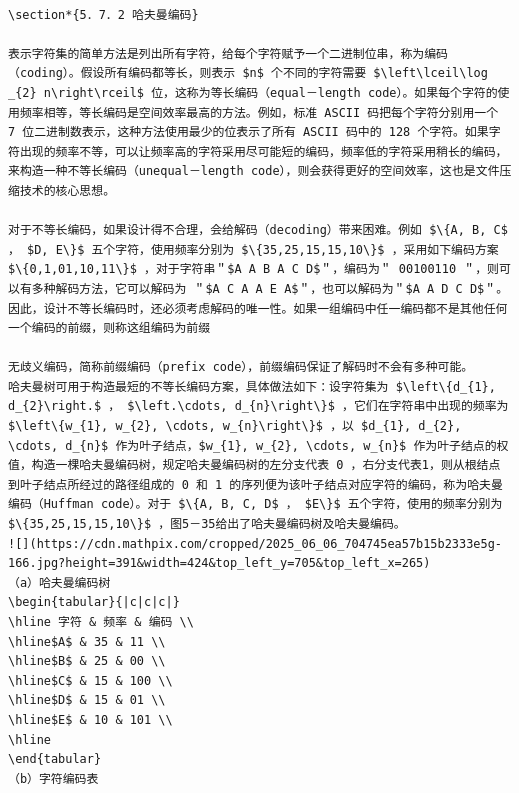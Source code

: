 \documentclass[10pt]{article}
\begin{document}
\begin{verbatim}

\section*{5．7．2 哈夫曼编码}

表示字符集的简单方法是列出所有字符，给每个字符赋予一个二进制位串，称为编码（coding）。假设所有编码都等长，则表示 $n$ 个不同的字符需要 $\left\lceil\log _{2} n\right\rceil$ 位，这称为等长编码（equal－length code）。如果每个字符的使用频率相等，等长编码是空间效率最高的方法。例如，标准 ASCII 码把每个字符分别用一个 7 位二进制数表示，这种方法使用最少的位表示了所有 ASCII 码中的 128 个字符。如果字符出现的频率不等，可以让频率高的字符采用尽可能短的编码，频率低的字符采用稍长的编码，来构造一种不等长编码（unequal－length code），则会获得更好的空间效率，这也是文件压缩技术的核心思想。

对于不等长编码，如果设计得不合理，会给解码（decoding）带来困难。例如 $\{A, B, C$ ， $D, E\}$ 五个字符，使用频率分别为 $\{35,25,15,15,10\}$ ，采用如下编码方案 $\{0,1,01,10,11\}$ ，对于字符串＂$A A B A C D$＂，编码为＂ 00100110 ＂，则可以有多种解码方法，它可以解码为 ＂$A C A A E A$＂，也可以解码为＂$A A D C D$＂。因此，设计不等长编码时，还必须考虑解码的唯一性。如果一组编码中任一编码都不是其他任何一个编码的前缀，则称这组编码为前缀

无歧义编码，简称前缀编码（prefix code），前缀编码保证了解码时不会有多种可能。
哈夫曼树可用于构造最短的不等长编码方案，具体做法如下：设字符集为 $\left\{d_{1}, d_{2}\right.$ ， $\left.\cdots, d_{n}\right\}$ ，它们在字符串中出现的频率为 $\left\{w_{1}, w_{2}, \cdots, w_{n}\right\}$ ，以 $d_{1}, d_{2}, \cdots, d_{n}$ 作为叶子结点，$w_{1}, w_{2}, \cdots, w_{n}$ 作为叶子结点的权值，构造一棵哈夫曼编码树，规定哈夫曼编码树的左分支代表 0 ，右分支代表1，则从根结点到叶子结点所经过的路径组成的 0 和 1 的序列便为该叶子结点对应字符的编码，称为哈夫曼编码（Huffman code）。对于 $\{A, B, C, D$ ， $E\}$ 五个字符，使用的频率分别为 $\{35,25,15,15,10\}$ ，图5－35给出了哈夫曼编码树及哈夫曼编码。
![](https://cdn.mathpix.com/cropped/2025_06_06_704745ea57b15b2333e5g-166.jpg?height=391&width=424&top_left_y=705&top_left_x=265)
（a）哈夫曼编码树
\begin{tabular}{|c|c|c|}
\hline 字符 & 频率 & 编码 \\
\hline$A$ & 35 & 11 \\
\hline$B$ & 25 & 00 \\
\hline$C$ & 15 & 100 \\
\hline$D$ & 15 & 01 \\
\hline$E$ & 10 & 101 \\
\hline
\end{tabular}
（b）字符编码表


\end{verbatim}
\end{document}
